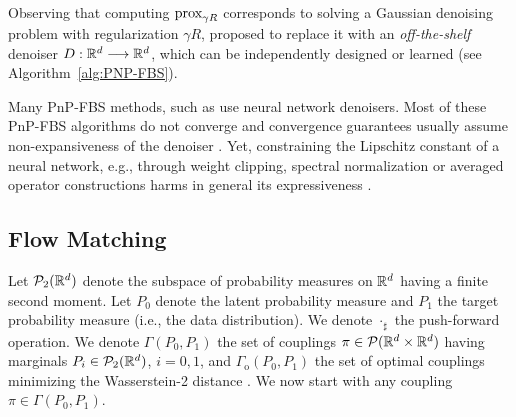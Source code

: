 \documentclass{article} %
\newcommand{\prox}{\text{\normalfont prox}}
\theoremstyle{definition}
\begin{document}
Observing that computing $\prox_{\gamma R}$ corresponds to solving a Gaussian denoising problem with regularization $\gamma R$, \citet{venkatakrishnan13pnp} proposed to replace it with an \emph{off-the-shelf} denoiser $D: \mathbb{R}^d \longrightarrow \mathbb{R}^d$, which can be independently designed or learned (see Algorithm~\ref{alg:PNP-FBS}).

Many PnP-FBS methods, such as \cite{meinhardt17learnprox,zhang2017beyond, zhang2021plug, SWK2019, terris20firmly, HNS2021, hurault2022gradient, tan2024provably} use neural network denoisers. 
Most of these PnP-FBS algorithms do not converge \citep{zhang2017beyond, SKM2019} and convergence guarantees usually assume non-expansiveness of the denoiser \citep{pesquet2021learning,ryu19prox, hurault2022prox}. 
Yet, constraining the Lipschitz constant of a neural network, e.g., through weight clipping, spectral normalization or averaged operator constructions harms in general its expressiveness \citep{ryu19prox}.


\subsection{Flow Matching}
\label{subsection:flow_matching}
Let $\mathcal P_2(\mathbb{R}^d)$ denote the subspace of probability measures on $\mathbb{R}^d$ having a finite second moment. Let $P_0$ denote the latent probability measure and $P_1$ the target probability measure (i.e., the data distribution). We denote $\cdot_\sharp$ the push-forward operation. We denote $\Gamma(P_0,P_1)$ the
set of couplings $\pi \in \mathcal P(\mathbb{R}^d \times \mathbb{R}^d)$ 
having marginals $P_i \in \mathcal P_2(\mathbb{R}^d)$, $i=0,1$, and $\Gamma_{\text{o}}(P_0,P_1)$ the set of optimal couplings minimizing the Wasserstein-2 distance \citep{villani}. We now start with any coupling $\pi \in \Gamma(P_0,P_1)$. 
\end{document}
